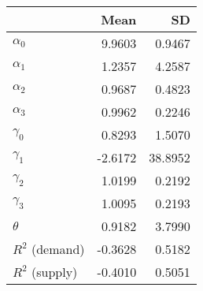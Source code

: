 
\begin{tabular}[t]{lrr}
\toprule
  & Mean & SD\\
\midrule
$\alpha_{0}$ & 9.9603 & 0.9467\\
$\alpha_{1}$ & 1.2357 & 4.2587\\
$\alpha_{2}$ & 0.9687 & 0.4823\\
$\alpha_{3}$ & 0.9962 & 0.2246\\
$\gamma_{0}$ & 0.8293 & 1.5070\\
$\gamma_{1}$ & -2.6172 & 38.8952\\
$\gamma_{2}$ & 1.0199 & 0.2192\\
$\gamma_{3}$ & 1.0095 & 0.2193\\
$\theta$ & 0.9182 & 3.7990\\
$R^{2}$ (demand) & -0.3628 & 0.5182\\
$R^{2}$ (supply) & -0.4010 & 0.5051\\
\bottomrule
\end{tabular}
